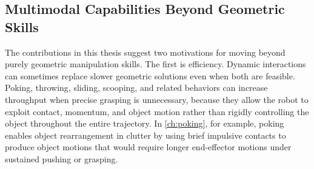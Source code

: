 

\subsection{Multimodal Capabilities Beyond Geometric Skills}
\label{sec:discussion:skills}

The contributions in this thesis suggest two motivations for moving beyond purely geometric manipulation skills.
The first is efficiency.
Dynamic interactions can sometimes replace slower geometric solutions even when both are feasible.
Poking, throwing, sliding, scooping, and related behaviors can increase throughput when precise grasping is unnecessary, because they allow the robot to exploit contact, momentum, and object motion rather than rigidly controlling the object throughout the entire trajectory.
In \cref{ch:poking}, for example, poking enables object rearrangement in clutter by using brief impulsive contacts to produce object motions that would require longer end-effector motions under sustained pushing or grasping.

